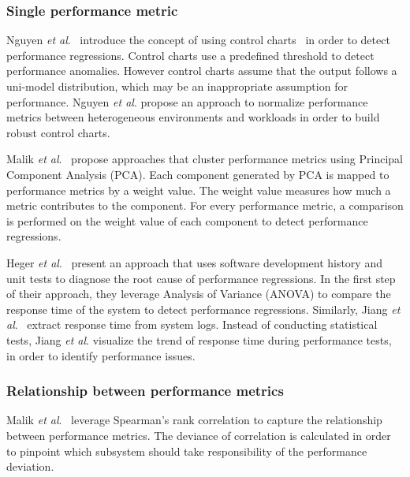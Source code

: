 \subsubsection{Single performance metric}
\label{sec:relatedindividual}
Nguyen \textit{et al$.$}~\cite{Nguyen:2012:ADP:2188286.2188344} introduce the concept of using control charts~\cite{shewhart1931economic} in order to detect performance regressions. Control charts use a predefined threshold to detect performance anomalies. However control charts assume that the output follows a uni-model distribution, which may be an inappropriate assumption for performance. Nguyen \textit{ et al$.$} propose an approach to normalize performance metrics between heterogeneous environments and workloads in order to build robust control charts. %

Malik \emph{et al$.$}~\cite{Malik:2010:ACL:1955601.1955936, haroon} propose approaches that cluster performance metrics using Principal Component Analysis (PCA). Each component generated by PCA is mapped to performance metrics by a weight value. The weight value measures how much a metric contributes to the component. For every performance metric, a comparison is performed on the weight value of each component to detect performance regressions.

Heger \emph{et al$.$}~\cite{DBLP:conf/wosp/HegerHF13} present an approach that uses software development history and unit tests to diagnose the root cause of performance regressions. In the first step of their approach, they leverage Analysis of Variance (ANOVA) to compare the response time of the system to detect performance regressions. Similarly, Jiang \emph{et al$.$}~\cite{jackicsm2009} extract response time from system logs. Instead of conducting statistical tests, Jiang \emph{et al$.$} visualize the trend of response time during performance tests, in order to identify performance issues.


\subsubsection{Relationship between performance metrics}
\label{sec:relatedrelation}

Malik \emph{et al$.$}~\cite{5635038} leverage Spearman's rank correlation to capture the relationship between performance metrics. The deviance of correlation is calculated in order to pinpoint which subsystem should take responsibility of the performance deviation.

